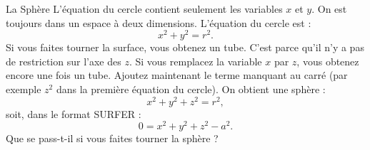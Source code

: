 \begin{surferPage}[Sphère]{La Sphère}
L'équation du cercle contient seulement les variables $x$ et $y$. On est toujours dans un espace à deux dimensions.
L'équation du cercle est :
\[x^2+y^2=r^2.\]
Si vous faites tourner la surface, vous obtenez un tube. C'est parce qu'il n'y a pas de restriction sur l'axe des $z$. 
Si vous remplacez la variable $x$ par $z$, vous obtenez encore une fois un tube. Ajoutez maintenant le terme manquant au carré (par exemple $z^2$ dans la première équation du cercle).
On obtient une sphère :
\[x^2+y^2+z^2=r^2,\]
soit, dans le format SURFER :
\[0=x^2+y^2+z^2-a^2.\]
Que se pass-t-il si vous faites tourner la sphère ?
\end{surferPage}
